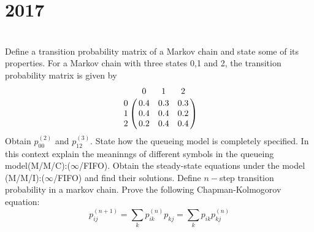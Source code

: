 \section*{2017}
\vspace{-.5cm}
\hrulefill \smallskip\\
 Define a transition probability matrix of a Markov chain and state some of its properties. For a Markov chain with three states 0,1 and 2, the transition probability matrix is given by
\[
     \bordermatrix{
      & 0   & 1   & 2   \cr
    0 & 0.4 & 0.3 & 0.3 \cr
    1 & 0.4 & 0.4 & 0.2 \cr
    2 & 0.2 & 0.4 & 0.4 \cr
    }  \] Obtain $p_{00}^{(2)}$ and $p_{12}^{(3)}$.
\myline
{} State how the queueing model is completely specified. In this context explain the meaninngs of different symbols in the queueing model(M/M/C):($\infty$/FIFO). Obtain the steady-state equations under the model (M/M/I):($\infty$/FIFO) and find their solutions. 
\myline
{} Define $n-$step transition probability in a markov chain. Prove the following Chapman-Kolmogorov equation:
\[p_{ij}^{(n+1)} = \sum_k p_{ik}^{(n)}p_{kj} = \sum_k p_{ik}p_{kj}^{(n)}\]
    
